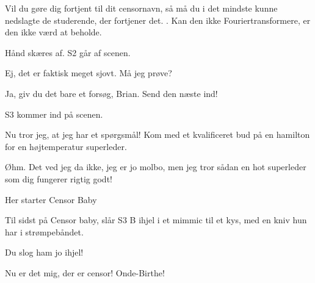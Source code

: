 \documentclass[a4paper,11pt]{article}
\begin{document}
\begin{sketch}
 Vil du gøre dig fortjent til dit censornavn, så må du i det mindste kunne nedslagte de studerende, der fortjener det. . Kan den ikke Fouriertransformere, er den ikke værd at beholde.

\scene Hånd skæres af. S2 går af scenen.

 Ej, det er faktisk meget sjovt. Må jeg prøve?

 Ja, giv du det bare et forsøg, Brian. Send den næste ind!

S3 kommer ind på scenen.

 Nu tror jeg, at jeg har et spørgsmål! Kom med et kvalificeret bud på en hamilton for en højtemperatur superleder.

 Øhm. Det ved jeg da ikke, jeg er jo molbo, men jeg tror sådan en hot superleder som dig fungerer rigtig godt! 

\begin{comment}

\says{K} Ikke dårligt, onde-Brian. Vil du have lov?

\scene K giver skalpellen til B

\says{B} Med glæde!

\act{S3 kigger desperat op på bandet og vinker til dem, mens B nærmer sig med skalpellen}

\end{comment}

\scene Her starter Censor Baby









\scene Til sidst på Censor baby, slår S3 B ihjel i et mimmic til et kys, med en kniv hun har i strømpebåndet.

Du slog ham jo ihjel!

 Nu er det mig, der er censor! Onde-Birthe!



\end{sketch}
\end{document}
